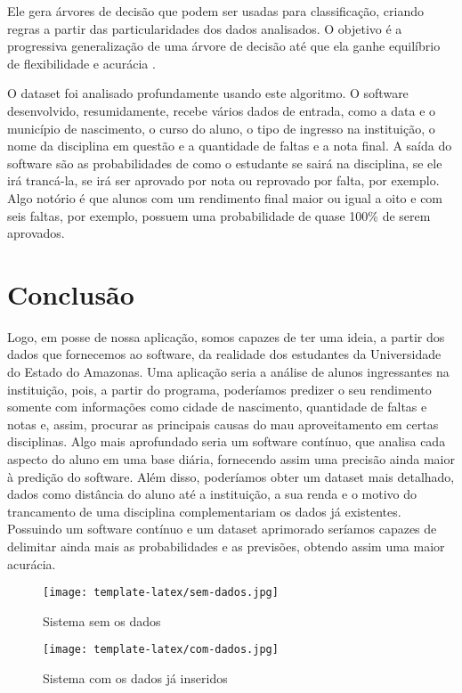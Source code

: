 \documentclass[12pt]{article}
\begin{document}
Ele gera árvores de decisão que podem ser usadas para classificação, criando regras a partir das particularidades dos dados analisados. O objetivo é a progressiva generalização de uma árvore de decisão até que ela ganhe equilíbrio de flexibilidade e acurácia \cite{J:48}.

O dataset foi analisado profundamente usando este algoritmo. O software desenvolvido, resumidamente, recebe vários dados de entrada, como a data e o município de nascimento, o curso do aluno, o tipo de ingresso na instituição, o nome da disciplina em questão e a quantidade de faltas e a nota final. A saída do software são as probabilidades de como o estudante se sairá na disciplina, se ele irá trancá-la, se irá ser aprovado por nota ou reprovado por falta, por exemplo. Algo notório é que alunos com um rendimento final maior ou igual a oito e com seis faltas, por exemplo, possuem uma probabilidade de quase 100\% de serem aprovados.


\section{Conclusão}

Logo, em posse de nossa aplicação, somos capazes de ter uma ideia, a partir dos dados que fornecemos ao software, da realidade dos estudantes da Universidade do Estado do Amazonas. Uma aplicação seria a análise de alunos ingressantes na instituição, pois, a partir do programa, poderíamos predizer o seu rendimento somente com informações como cidade de nascimento, quantidade de faltas e notas e, assim, procurar as principais causas do mau aproveitamento em certas disciplinas. Algo mais aprofundado seria um software contínuo, que analisa cada aspecto do aluno em uma base diária, fornecendo assim uma precisão ainda maior à predição do software. Além disso, poderíamos obter um dataset mais detalhado, dados como distância do aluno até a instituição, a sua renda e o motivo do trancamento de uma disciplina complementariam os dados já existentes. Possuindo um software contínuo e um dataset aprimorado seríamos capazes de delimitar ainda mais as probabilidades e as previsões, obtendo assim uma maior acurácia.








\begin{figure}[ht]
\centering
\texttt{[image: template-latex/sem-dados.jpg]}
\caption{Sistema sem os dados}
\label{fig:exampleFig1}
\end{figure}


\begin{figure}[htt]
\centering
\texttt{[image: template-latex/com-dados.jpg]}
\caption{Sistema com os dados já inseridos}
\label{fig:exampleFig2}
\end{figure}

\end{document}
